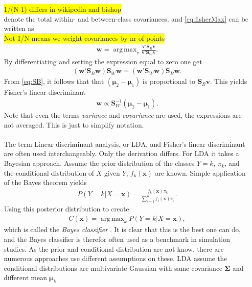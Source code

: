 \documentclass[10pt,a4paper]{article}
\DeclareMathOperator*{\argmax}{arg\,max}
\begin{document}
\colorbox{yellow}{1/(N-1) differs in wikipedia and bishop}\\
denote the total within- and between-class covariances, and \eqref{eq:fisherMax} can be written as
\\ \colorbox{yellow}{Not 1/N means we weight covariances by nr of points}\\
\begin{align}
  \mathbf{w} = \argmax_v  \frac{\mathbf{v}'\mathbf{S}_B \mathbf{v}}{\mathbf{v}' \mathbf{S}_W \mathbf{v}}.
\end{align}
By differentiating and setting the expression equal to zero one get
\begin{align}
  (\mathbf{w}' \mathbf{S}_B \mathbf{w})\mathbf{S}_W \mathbf{w} = (\mathbf{w}' \mathbf{S}_W \mathbf{w})\mathbf{S}_B \mathbf{w}.
\end{align}
From \eqref{eq:SB}, it follows that that $(\bm{\mu}_2 - \bm{\mu}_1)$ is proportional to $\mathbf{S}_B \mathbf{v}$. This yields Fisher's linear discriminant
\begin{align}
  \mathbf{w} \propto \mathbf{S}_W^{-1} (\bm \mu_2 - \bm \mu_1).
\end{align}
Note that even the terms \textit{variance} and \textit{covariance} are used, the expressions are not averaged. This is just to simplify notation. \\
\\
The term Linear discriminant analysis, or LDA, and Fisher's linear discriminant are often used interchangeably. Only the derivation differs. For LDA it takes a Bayesian approach. Assume the prior distribution of the classes $Y=k$, $\pi_k$, and the conditional distribution of $X$ given $Y$, $f_k(\mathbf{x})$ are known. Simple application of the Bayes theorem yields 
\begin{align}
  P(Y=k|X=\mathbf{x}) = \frac{f_k(\mathbf{x}) \pi_k}{\sum^{K}_{i=1} f_i(\mathbf{x})\pi_i} .
\end{align}
Using this posterior distribution to create
\begin{align}
  \label{eq:bayesian} 
  C(\mathbf{x}) = \argmax_k P(Y=k|X=\mathbf{x}),
\end{align}
which is called the \textit{Bayes classifier} \cite[p.~21]{modstat}. It is clear that this is the best one can do, and the Bayes classifier is therefor often used as a benchmark in simulation studies. As the prior and conditional distribution are not know, there are numerous approaches use different assumptions on these. LDA assume the conditional distributions are multivariate Gaussian with same covariance $\bm{\Sigma}$ and different mean $\bm\mu_k$
\end{document}
